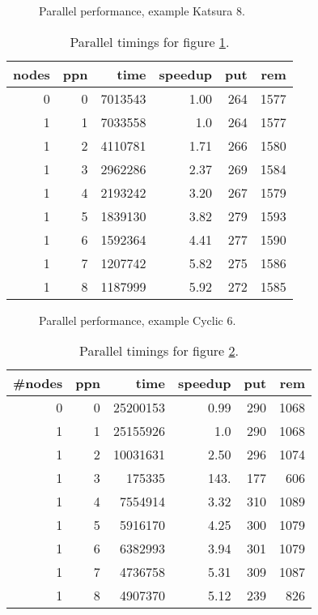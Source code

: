 \documentclass[10pt,twocolumn,a4paper]{article}
\begin{document}
\begin{figure}[thb]
\centering
{}
\caption{Parallel performance, example Katsura 8.}
\label{fig:kat8par_1}
\end{figure}

\begin{table}[thb]
\centering
\caption{Parallel timings for figure \ref{fig:kat8par_1}.}
\label{fig:kat8_par1}
\small{
\clearpage{}
\begin{tabular}{|r|r|r|r|r|r|}
\hline
 nodes & ppn & time & speedup & put & rem 
\\ \hline
 0 & 0 & 7013543 & 1.00 & 264 & 1577
\\ \hline
 1 & 1 & 7033558 & 1.0 & 264 & 1577
\\ \hline
 1 & 2 & 4110781 & 1.71 & 266 & 1580
\\ \hline
 1 & 3 & 2962286 & 2.37 & 269 & 1584
\\ \hline
 1 & 4 & 2193242 & 3.20 & 267 & 1579
\\ \hline
 1 & 5 & 1839130 & 3.82 & 279 & 1593
\\ \hline
 1 & 6 & 1592364 & 4.41 & 277 & 1590
\\ \hline
 1 & 7 & 1207742 & 5.82 & 275 & 1586
\\ \hline
 1 & 8 & 1187999 & 5.92 & 272 & 1585
\\ \hline
\end{tabular}
\clearpage{}
}
\end{table}

\begin{figure}[thb]
\centering
{}
\caption{Parallel performance, example Cyclic 6.}
\label{fig:c6par1}
\end{figure}

\begin{table}[thb]
\centering
\caption{Parallel timings for figure \ref{fig:c6par1}.}
\label{fig:c61par1t}
\small{
\clearpage{}
\begin{tabular}{|r|r|r|r|r|r|}
\hline
\#nodes & ppn & time & speedup & put & rem 
\\ \hline
 0 & 0 & 25200153 & 0.99 & 290 & 1068
\\ \hline
 1 & 1 & 25155926 & 1.0 & 290 & 1068
\\ \hline
 1 & 2 & 10031631 & 2.50 & 296 & 1074
\\ \hline
 1 & 3 & 175335   & 143. & 177 & 606
\\ \hline
 1 & 4 & 7554914  & 3.32 & 310 & 1089
\\ \hline
 1 & 5 & 5916170  & 4.25 & 300 & 1079
\\ \hline
 1 & 6 & 6382993  & 3.94 & 301 & 1079
\\ \hline
 1 & 7 & 4736758  & 5.31 & 309 & 1087
\\ \hline
 1 & 8 & 4907370  & 5.12 & 239 & 826
\\ \hline
\end{tabular}
\clearpage{}
}
\end{table}
\end{document}
